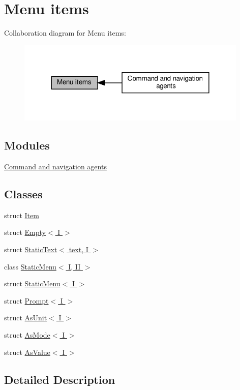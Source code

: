 \hypertarget{group__Items}{}\section{Menu items}
\label{group__Items}
Collaboration diagram for Menu items\+:\nopagebreak
\begin{figure}[H]
\begin{center}
\leavevmode
\includegraphics[width=312pt]{group__Items}
\end{center}
\end{figure}
\subsection*{Modules}
\begin{DoxyCompactItemize}
\item 
\hyperlink{group__Agents}{Command and navigation agents}
\end{DoxyCompactItemize}
\subsection*{Classes}
\begin{DoxyCompactItemize}
\item 
struct \hyperlink{structItem}{Item}
\item 
struct \hyperlink{structEmpty}{Empty$<$ I $>$}
\item 
struct \hyperlink{structStaticText}{Static\+Text$<$ text, I $>$}
\item 
class \hyperlink{classStaticMenu}{Static\+Menu$<$ I, I\+I $>$}
\item 
struct \hyperlink{structStaticMenu_3_01I_01_4}{Static\+Menu$<$ I $>$}
\item 
struct \hyperlink{structPrompt}{Prompt$<$ I $>$}
\item 
struct \hyperlink{structAsUnit}{As\+Unit$<$ I $>$}
\item 
struct \hyperlink{structAsMode}{As\+Mode$<$ I $>$}
\item 
struct \hyperlink{structAsValue}{As\+Value$<$ I $>$}
\end{DoxyCompactItemize}


\subsection{Detailed Description}
